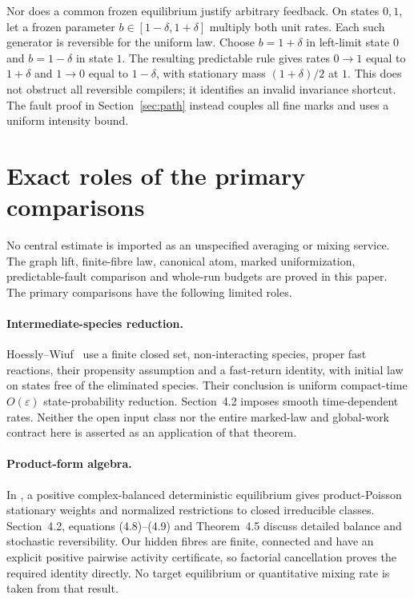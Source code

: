 \documentclass[11pt,reqno]{amsart}
\theoremstyle{definition}
\theoremstyle{remark}
\begin{document}
Nor does a common frozen equilibrium justify arbitrary feedback. On states
$0,1$, let a frozen parameter $b\in[1-\delta,1+\delta]$ multiply both unit
rates. Each such generator is reversible for the uniform law. Choose
$b=1+\delta$ in left-limit state $0$ and $b=1-\delta$ in state $1$.
The resulting predictable rule gives rates $0\to1$ equal to $1+\delta$ and
$1\to0$ equal to $1-\delta$, with stationary mass $(1+\delta)/2$ at $1$.
This does not obstruct all reversible compilers; it identifies an invalid
invariance shortcut. The fault proof in Section~\ref{sec:path} instead
couples all fine marks and uses a uniform intensity bound.

\section{Exact roles of the primary comparisons}\label{app:literature}
No central estimate is imported as an unspecified averaging or mixing service.
The graph lift, finite-fibre law, canonical atom, marked uniformization,
predictable-fault comparison and whole-run budgets are proved in this paper.
The primary comparisons have the following limited roles.

\paragraph{Intermediate-species reduction.}
Hoessly--Wiuf~\cite[Assumption~2, Theorem~4.1]{HW2021} use a finite closed set,
non-interacting species, proper fast reactions, their propensity assumption
and a fast-return identity, with initial law on states free of the eliminated
species. Their conclusion is uniform compact-time $O(\varepsilon)$
state-probability reduction. Section~4.2 imposes smooth time-dependent rates.
Neither the open input class nor the entire marked-law and global-work
contract here is asserted as an application of that theorem.

\paragraph{Product-form algebra.}
In \cite[Theorem~4.1]{ACK2010}, a positive complex-balanced deterministic
equilibrium gives product-Poisson stationary weights and normalized
restrictions to closed irreducible classes. Section~4.2, equations
(4.8)--(4.9) and Theorem~4.5 discuss detailed balance and stochastic
reversibility. Our hidden fibres are finite, connected and have an explicit
positive pairwise activity certificate, so factorial cancellation proves the
required identity directly. No target equilibrium or quantitative mixing
rate is taken from that result.
\end{document}

